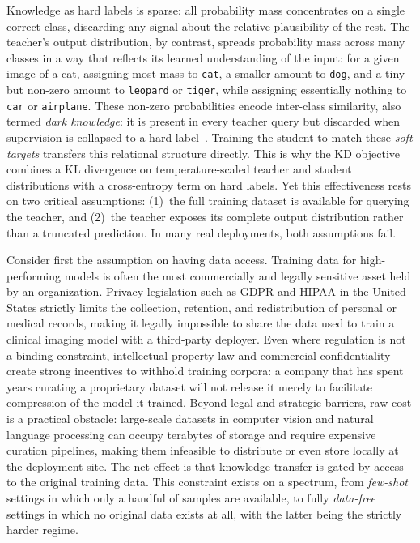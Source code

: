 \begin{foldable}
  Knowledge as hard labels is sparse: all probability mass concentrates on a single correct class, discarding any signal about the relative plausibility of the rest.
  The teacher's output distribution, by contrast, spreads probability mass across many classes in a way that reflects its learned understanding of the input: for a given image of a cat, assigning most mass to \texttt{cat}, a smaller amount to \texttt{dog}, and a tiny but non-zero amount to \texttt{leopard} or \texttt{tiger}, while assigning essentially nothing to \texttt{car} or \texttt{airplane}.
  These non-zero probabilities encode inter-class similarity, also termed \textit{dark knowledge}: it is present in every teacher query but discarded when supervision is collapsed to a hard label~\cite{hinton2015distilling}.
  Training the student to match these \textit{soft targets} transfers this relational structure directly.
  This is why the \ac{KD} objective combines a \ac{KL} divergence on temperature-scaled teacher and student distributions with a cross-entropy term on hard labels.
  Yet this effectiveness rests on two critical assumptions: (1)~the full training dataset is available for querying the teacher, and (2)~the teacher exposes its complete output distribution rather than a truncated prediction.
  In many real deployments, both assumptions fail.
\end{foldable}

\begin{foldable}
  Consider first the assumption on having data access.
  Training data for high-performing models is often the most commercially and legally sensitive asset held by an organization.
  Privacy legislation such as \ac{GDPR}\cite{eu2016gdpr} and \ac{HIPAA}\cite{us1996hipaa} in the United States strictly limits the collection, retention, and redistribution of personal or medical records, making it legally impossible to share the data used to train a clinical imaging model with a third-party deployer.
  Even where regulation is not a binding constraint, intellectual property law and commercial confidentiality create strong incentives to withhold training corpora: a company that has spent years curating a proprietary dataset will not release it merely to facilitate compression of the model it trained.
  Beyond legal and strategic barriers, raw cost is a practical obstacle: large-scale datasets in computer vision and natural language processing can occupy terabytes of storage and require expensive curation pipelines, making them infeasible to distribute or even store locally at the deployment site.
  The net effect is that knowledge transfer is gated by access to the original training data.
  This constraint exists on a spectrum, from \textit{few-shot} settings in which only a handful of samples are available, to fully \textit{data-free} settings in which no original data exists at all, with the latter being the strictly harder regime.
\end{foldable}

